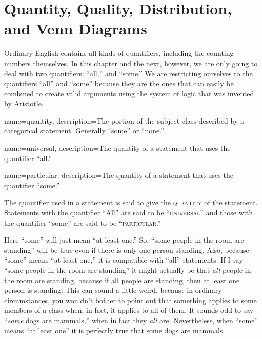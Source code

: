 \section{Quantity, Quality, Distribution, and Venn Diagrams}
\label{sec:QQDVD}
Ordinary English contains all kinds of quantifiers, including the counting numbers themselves. In this chapter and the next, however, we are only going to deal with two quantifiers: ``all,'' and ``some.'' We are restricting ourselves to the quantifiers ``all'' and ``some'' because they are the ones that can easily be combined to create valid arguments using the system of logic that was invented by Aristotle. 

{
name=quantity,
description={The portion of the subject class described by a categorical statement. Generally ``some'' or ``none.''}
}

{
name=universal,
description={The quantity of a statement that uses the quantifier ``all.''}
}

{
name=particular,
description={The quantity of a statement that uses the quantifier ``some.''}
}

The quantifier used in a statement is said to give the \textsc{\gls{quantity}} \label{def:Quantity} of the statement. Statements with the quantifier ``All'' are said to be ``\textsc{\gls{universal}}'' and those with the quantifier ``some'' are said to be ``\textsc{\gls{particular}}.''

Here ``some'' will just mean ``at least one.'' So, ``some people in the room are standing'' will be true even if there is only one person standing. Also, because ``some'' means ``at least one,'' it is compatible with ``all'' statements. If I say ``some people in the room are standing'' it might actually be that \textit{all} people in the room are standing, because if all people are standing, then at least one person is standing. This can sound a little weird, because in ordinary circumstances, you wouldn't bother to point out that something applies to some members of a class when, in fact, it applies to all of them. It sounds odd to say ``\textit{some} dogs are mammals,'' when in fact they \textit{all} are. Nevertheless, when ``some'' means ``at least one'' it is perfectly true that some dogs are mammals. 


